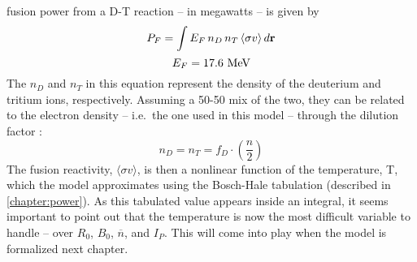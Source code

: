    fusion power from a D-T reaction -- in megawatts -- is given by 
 \begin{equation}
 	\label{eq:pf_int}
 	P_F = \int E_F \, n_D \, n_T \, \langle \sigma v \rangle \, d \vec{\bold{r}}
 \end{equation}
\begin{equation}
	E_F = 17.6 \ \textnormal{MeV}
\end{equation}
 The $n_D$ and $n_T$ in this equation  represent the density of the deuterium and tritium ions, respectively. Assuming a 50-50 mix of the two, they can be related to the electron density -- i.e.\ the one used in this model -- through the dilution factor :
\begin{equation}
	n_D = n_T = f_D \cdot \left( \frac{n}{2} \right)
\end{equation}
 The fusion reactivity, $\langle \sigma v \rangle$, is then a nonlinear function of the temperature, T, which the model approximates using the Bosch-Hale tabulation (described in \cref{chapter:power}). As this tabulated value appears inside an integral, it seems important to point out that the temperature is now the most difficult  variable to handle -- over $R_0$, $B_0$, $\overline n$, and $I_P$. This will come into play when the model is formalized next chapter.

